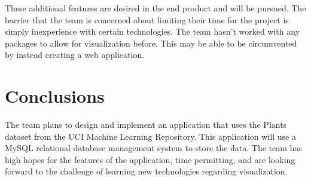 \documentclass{Group6_Phase0}
\begin{document}
These additional features are desired in the end product and will be pursued. The barrier that the team is concerned about limiting their time for the project is simply inexperience with certain technologies. The team hasn't worked with any packages to allow for visualization before. This may be able to be circumvented by instead creating a web application.

\section{Conclusions}
The team plans to design and implement an application that uses the Plants dataset from the UCI Machine Learning Repository. This application will use a MySQL relational database management system to store the data. The team has high hopes for the features of the application, time permitting, and are looking forward to the challenge of learning new technologies regarding visualization.
\end{document}
